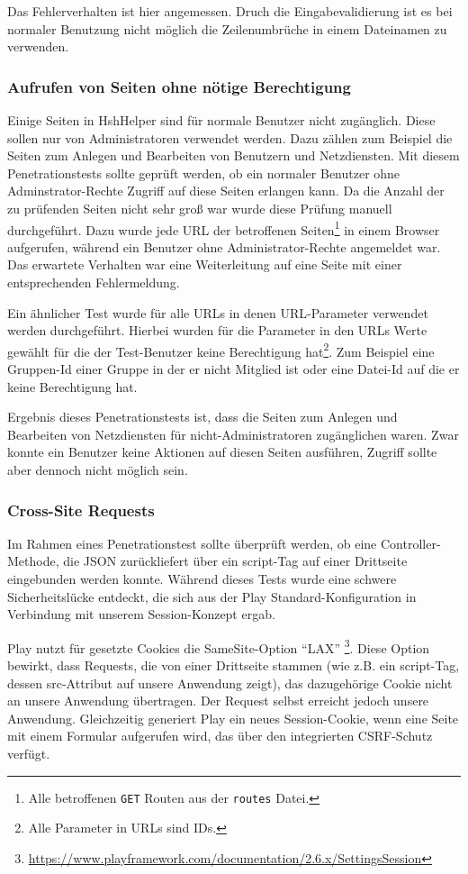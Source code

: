 \documentclass[12pt,DIV14,BCOR10mm,a4paper,parskip=half-,headsepline,headinclude,english,ngerman,bibliography=totocnumbered]{scrreprt}
\begin{document}
Das Fehlerverhalten ist hier angemessen. Druch die Eingabevalidierung ist es bei normaler Benutzung nicht möglich die Zeilenumbrüche in einem Dateinamen zu verwenden.


\subsubsection{Aufrufen von Seiten ohne nötige Berechtigung}
Einige Seiten in HshHelper sind für normale Benutzer nicht zugänglich. Diese sollen nur von Administratoren verwendet werden. Dazu zählen zum Beispiel die Seiten zum Anlegen und Bearbeiten von Benutzern und Netzdiensten. Mit diesem Penetrationstests sollte geprüft werden, ob ein normaler Benutzer ohne Adminstrator-Rechte Zugriff auf diese Seiten erlangen kann. Da die Anzahl der zu prüfenden Seiten nicht sehr groß war wurde diese Prüfung manuell durchgeführt. Dazu wurde jede URL der betroffenen Seiten\footnote{Alle betroffenen \texttt{GET} Routen aus der \texttt{routes} Datei.} in einem Browser aufgerufen, während ein Benutzer ohne Administrator-Rechte angemeldet war. Das erwartete Verhalten war eine Weiterleitung auf eine Seite mit einer entsprechenden Fehlermeldung.

Ein ähnlicher Test wurde für alle URLs in denen URL-Parameter verwendet werden durchgeführt. Hierbei wurden für die Parameter in den URLs Werte gewählt für die der Test-Benutzer keine Berechtigung hat\footnote{Alle Parameter in URLs sind IDs.}. Zum Beispiel eine Gruppen-Id einer Gruppe in der er nicht Mitglied ist oder eine Datei-Id auf die er keine Berechtigung hat. 

Ergebnis dieses Penetrationstests ist, dass die Seiten zum Anlegen und Bearbeiten von Netzdiensten für nicht-Administratoren zugänglichen waren. Zwar konnte ein Benutzer keine Aktionen auf diesen Seiten ausführen, Zugriff sollte aber dennoch nicht möglich sein.

\subsubsection{Cross-Site Requests}
\label{csrf:analyse} 
Im Rahmen eines Penetrationstest sollte überprüft werden, ob eine Controller-Methode, die JSON zurückliefert über ein script-Tag auf einer Drittseite eingebunden werden konnte. Während dieses Tests wurde eine schwere Sicherheitslücke entdeckt, die sich aus der Play Standard-Konfiguration in Verbindung mit unserem Session-Konzept ergab.

Play nutzt für gesetzte Cookies die SameSite-Option \enquote{LAX} \footnote{\url{https://www.playframework.com/documentation/2.6.x/SettingsSession}}. Diese Option bewirkt, dass Requests, die von einer Drittseite stammen (wie z.B. ein script-Tag, dessen src-Attribut auf unsere Anwendung zeigt), das dazugehörige Cookie nicht an unsere Anwendung übertragen. Der Request selbst erreicht jedoch unsere Anwendung. Gleichzeitig generiert Play ein neues Session-Cookie, wenn eine Seite mit einem Formular aufgerufen wird, das über den integrierten CSRF-Schutz verfügt.
\end{document}
